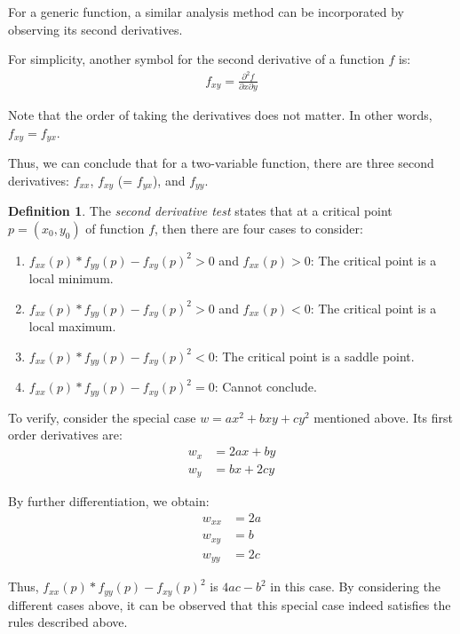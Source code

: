 \documentclass[12pt]{article}
\theoremstyle{definition}
\newtheorem{defn}{Definition}[section]
\begin{document}
	For a generic function, a similar analysis method can be incorporated by observing its second derivatives.
	
	For simplicity, another symbol for the second derivative of a function $f$ is:
	\begin{gather*}
		f_{xy} = \frac{\partial^2 f}{\partial x \partial y}
	\end{gather*}
	
	Note that the order of taking the derivatives does not matter. In other words, $f_{xy} = f_{yx}$.
	
	Thus, we can conclude that for a two-variable function, there are three second derivatives: $f_{xx}$, $f_{xy}$ (= $f_{yx}$), and $f_{yy}$.
	
	\begin{defn}
		The \emph{second derivative test} states that at a critical point $p = (x_0, y_0)$ of function $f$, then there are four cases to consider:
		\begin{enumerate}
			\item $f_{xx}(p) * f_{yy}(p) - f_{xy}(p)^2 > 0$ and $f_{xx}(p) > 0$: The critical point is a local minimum.
			\item $f_{xx}(p) * f_{yy}(p) - f_{xy}(p)^2 > 0$ and $f_{xx}(p) < 0$: The critical point is a local maximum.
			\item $f_{xx}(p) * f_{yy}(p) - f_{xy}(p)^2 < 0$: The critical point is a saddle point.
			\item $f_{xx}(p) * f_{yy}(p) - f_{xy}(p)^2 = 0$: Cannot conclude.
		\end{enumerate}
	\end{defn}
	
	To verify, consider the special case $w = ax^2 + bxy + cy^2$ mentioned above. Its first order derivatives are:
	\begin{align*}
		w_x &= 2ax + by \\
		w_y &= bx + 2cy
	\end{align*}
	
	By further differentiation, we obtain:
	\begin{align*}
		w_{xx} &= 2a \\
		w_{xy} &= b\\
		w_{yy} &= 2c
	\end{align*}
	
	Thus, $f_{xx}(p) * f_{yy}(p) - f_{xy}(p)^2$ is $4ac - b^2$ in this case. By considering the different cases above, it can be observed that this special case indeed satisfies the rules described above.
	
\end{document}
